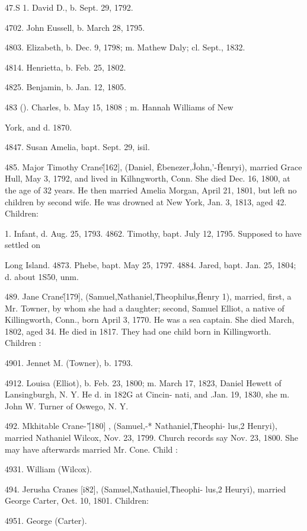 47.S 1. David D., b. Sept. 29, 1792. 

4702. John Eussell, b. March 28, 1795. 

4803. Elizabeth, b. Dec. 9, 1798; m. Mathew Daly; cl. Sept., 1832. 

4814. Henrietta, b. Feb. 25, 1802. 

4825. Benjamin, b. Jan. 12, 1805. 

483 (). Charles, b. May 15, 1808 ; m. Hannah Williams of New 

York, and d. 1870. 

4847. Susan Amelia, bapt. Sept. 29, isil. 

485. Major Timothy Crane\^ [162], (Daniel, \^ Ebenezer,\^ 
John,'-\^ Henryi), married Grace Hull, May 3, 1792, and lived in 
Kilhngworth, Conn. She died Dec. 16, 1800, at the age of 32 
years. He then married Amelia Morgan, April 21, 1801, but 
left no children by second wife. He was drowned at New York, 
Jan. 3, 1813, aged 42. Children: 

1. Infant, d. Aug. 25, 1793. 
4862. Timothy, bapt. July 12, 1795. Supposed to have settled on 

Long Island. 
4873. Phebe, bapt. May 25, 1797. 
4884. Jared, bapt. Jan. 25, 1804; d. about 1S50, unm. 

489. Jane Crane\^ [179], (Samuel,\^ Nathaniel,\^ Theophilus,\^ 
Henry 1), married, first, a Mr. Towner, by whom she had a 
daughter; second, Samuel Elliot, a native of Killingworth, Conn., 
born April 3, 1770. He was a sea captain. She died March, 
1802, aged 34. He died in 1817. They had one child born in 
Killingworth. Children : 

4901. Jennet M. (Towner), b. 1793. 

4912. Louisa (Elliot), b. Feb. 23, 1800; m. March 17, 1823, Daniel 
Hewett of Lansingburgh, N. Y. He d. in 182G at Cincin- 
nati, and .Jan. 19, 1830, she m. John W. Turner of Oswego, 
N. Y. 

492. Mkhitable Crane-'\^ [180] , (Samuel,-* Nathaniel,\^ Theophi- 
lus,2 Henryi), married Nathaniel Wilcox, Nov. 23, 1799. Church 
records say Nov. 23, 1800. She may have afterwards married 
Mr. Cone. Child : 

4931. William (Wilcox). 




494. Jerusha Cranes [i82], (Samuel,\^ Nathauiel,\^ Theophi- 
lus,2 Heuryi), married George Carter, Oct. 10, 1801. Children: 

4951. George (Carter). 

